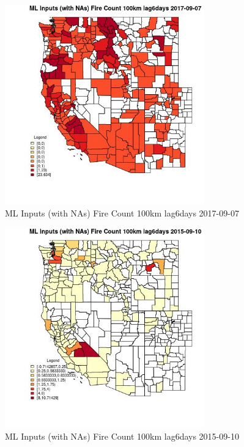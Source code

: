 \begin{figure} 
\centering  
\includegraphics[width=0.77\textwidth]{Code_Outputs/Report_ML_input_PM25_Step4_part_e_de_duplicated_aves_compiled_2019-05-20wNAs_CountyFire_Count_100km_lag6daysMean2017-09-07.jpg} 
\caption{\label{fig:Report_ML_input_PM25_Step4_part_e_de_duplicated_aves_compiled_2019-05-20wNAsCountyFire_Count_100km_lag6daysMean2017-09-07}ML Inputs (with NAs) Fire Count 100km lag6days 2017-09-07} 
\end{figure} 
 

\begin{figure} 
\centering  
\includegraphics[width=0.77\textwidth]{Code_Outputs/Report_ML_input_PM25_Step4_part_e_de_duplicated_aves_compiled_2019-05-20wNAs_CountyFire_Count_100km_lag6daysMean2015-09-10.jpg} 
\caption{\label{fig:Report_ML_input_PM25_Step4_part_e_de_duplicated_aves_compiled_2019-05-20wNAsCountyFire_Count_100km_lag6daysMean2015-09-10}ML Inputs (with NAs) Fire Count 100km lag6days 2015-09-10} 
\end{figure} 
 

